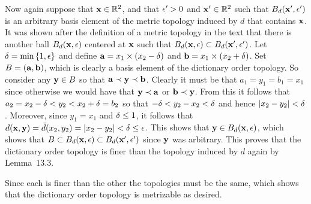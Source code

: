 {{    Now again suppose that $\mathbf{x} \in {\mathbb{R}}^2$, and that $\epsilon' > 0$ and $\mathbf{x}' \in {\mathbb{R}}^2$ such that $B_d(\mathbf{x}', \epsilon')$ is an arbitrary basis element of the metric topology induced by $d$ that contains $\mathbf{x}$.
    It was shown after the definition of a metric topology in the text that there is another ball $B_d(\mathbf{x}, \epsilon)$ centered at $\mathbf{x}$ such that $B_d(\mathbf{x}, \epsilon) \subset B_d(\mathbf{x}', \epsilon')$.
    Let $\delta = \min\left\{ 1, \epsilon \right\}$ and define $\mathbf{a} = x_1 \times (x_2 - \delta)$ and $\mathbf{b} = x_1 \times (x_2 + \delta)$.
    Set $B = (\mathbf{a}, \mathbf{b})$, which is clearly a basis element of the dictionary order topology.
    So consider any $\mathbf{y} \in B$ so that $\mathbf{a} \prec \mathbf{y} \prec \mathbf{b}$.
    Clearly it must be that $a_1 = y_1 = b_1 = x_1$ since otherwise we would have that $\mathbf{y} \prec \mathbf{a}$ or $\mathbf{b} \prec \mathbf{y}$.
    From this it follows that $a_2 = x_2 - \delta < y_2 < x_2 + \delta = b_2$ so that $-\delta < y_2 - x_2 < \delta$ and hence $\left| x_2 - y_2 \right| < \delta$.
    Moreover, since $y_1 = x_1$ and $\delta \leq 1$, it follows that $d(\mathbf{x}, \mathbf{y}) = \bar{d}(x_2, y_2) = \left| x_2 - y_2 \right| < \delta \leq \epsilon$.
    This shows that $\mathbf{y} \in B_d(\mathbf{x}, \epsilon)$, which shows that $B \subset B_d(\mathbf{x}, \epsilon) \subset B_d(\mathbf{x}', \epsilon')$ since $\mathbf{y}$ was arbitrary.
    This proves that the dictionary order topology is finer than the topology induced by $d$ again by Lemma~13.3.

    Since each is finer than the other the topologies must be the same, which shows that the dictionary order topology is metrizable as desired.
  }
}

